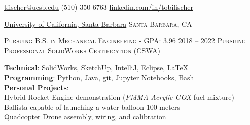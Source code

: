 \documentclass[12pt]{article}
\begin{document}
\sloppy  %



\nobreakvspace{0.3em}  %



\noindent\href{mailto:tfischer@ucsb.edu}{tfischer@ucsb.edu}\sbull
(510) 350-6763 \sbull
\href{https://linkedin.com/in/tobifischer}{linkedin.com/in/tobifischer}\hfill
{}


\spacedhrule{0.2em}{-0.6em}  %


\headedsection
{\href{https://engineering.ucsb.edu/}{University of California, Santa Barbara}}
{\textsc{Santa Barbara, CA}} {%
	\headedsubsection
	{\textsc{Pursuing B.S. in Mechanical Engineering - GPA:} 3.96}
	{2018 -- 2022}{}
	\headedsubsection
	{\textsc{Pursuing Professional SolidWorks Certification (CSWA)}}{}{}
	
}

\spacedhrule{0.5em}{-0.5em}


	\textbf{Technical}: SolidWorks, SketchUp, IntelliJ, Eclipse, \LaTeX\\
	\textbf{Programming}: Python, Java, git, Jupyter Notebooks, Bash\\
	\textbf{Personal Projects}:\\
		 \sbull Hybrid Rocket Engine demonstration (\textit{PMMA Acrylic-GOX} fuel mixture)\\
		 \sbull Ballista capable of launching a water balloon 100 meters\\
		 \sbull Quadcopter Drone assembly, wiring, and calibration\\
	
\end{document}
